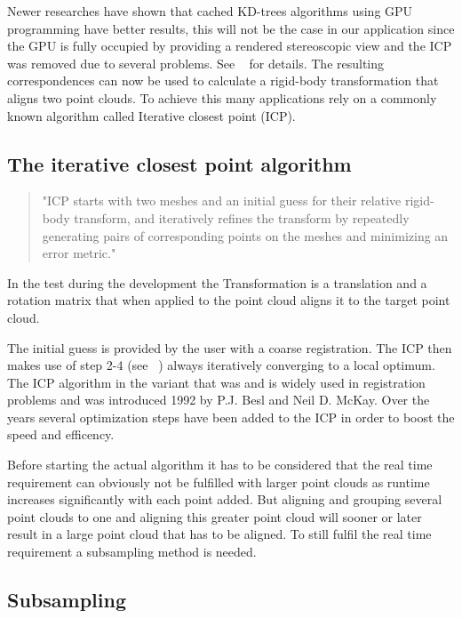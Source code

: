 \documentclass[hyperref,english,bachelorofscience,bibnum,twoside]{cgvpub}
\begin{document}
Newer researches have shown that cached KD-trees algorithms using GPU programming have better results\cite{Garcia2008}, this will not be the case in our application since the GPU is fully occupied by providing a rendered stereoscopic view and the ICP was removed due to several problems. See ~ for details.
The resulting correspondences can now be used to calculate a rigid-body transformation that aligns two point clouds. To achieve this many applications rely on a commonly known algorithm called Iterative closest point (ICP).

\subsection{The iterative closest point algorithm}

\begin{quote}
"ICP starts with two meshes and an initial guess for their relative rigid-body transform, and iteratively refines the transform by repeatedly generating pairs of corresponding points on the meshes and minimizing an error metric."\cite{Rusinkiewicza}
\end{quote}
In the test during the development the Transformation is a translation and a rotation matrix that when applied to the point cloud aligns it to the target point cloud.

The initial guess is provided by the user with a coarse registration. The ICP then makes use of step 2-4 (see ~) always iteratively converging to a local optimum.\cite{Besl92}
The ICP algorithm in the variant that was and is widely used in registration problems and was introduced 1992 by P.J. Besl and Neil D. McKay\cite{Besl92}. Over the years several optimization steps have been added to the ICP in order to boost the speed and efficency.

Before starting the actual algorithm it has to be considered that the real time requirement can obviously not be fulfilled with larger point clouds as runtime increases significantly with each point added. But aligning and grouping several point clouds to one and aligning this greater point cloud will sooner or later result in a large point cloud that has to be aligned. To still fulfil the real time requirement a subsampling method is needed.

\subsection{Subsampling}
\end{document}
